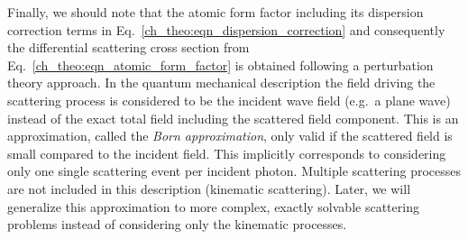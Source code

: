 Finally, we should note that the atomic form factor including its dispersion correction terms in Eq.~\eqref{ch_theo:eqn_dispersion_correction} and consequently the differential scattering cross section from Eq.~\eqref{ch_theo:eqn_atomic_form_factor} is obtained following a perturbation theory approach. In the quantum mechanical description the field driving the scattering process is considered to be the incident wave field (e.g.~a plane wave) instead of the exact total field including the scattered field component. This is an approximation, called the \emph{Born approximation}, only valid if the scattered field is small compared to the incident field. This implicitly corresponds to considering only one single scattering event per incident photon. Multiple scattering processes are not included in this description (kinematic scattering). Later, we will generalize this approximation to more complex, exactly solvable scattering problems instead of considering only the kinematic processes.




